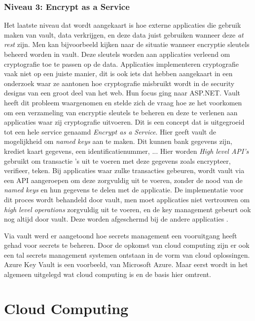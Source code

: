 \subsubsection{Niveau 3: Encrypt as a Service}

Het laatste niveau dat wordt aangekaart is hoe externe applicaties die gebruik maken van vault, data verkrijgen, en deze data juist gebruiken wanneer deze \textit{at rest} zijn. Men kan bijvoorbeeld kijken naar de situatie wanneer encryptie sleutels beheerd worden in vault. Deze sleutels worden aan applicaties verleend om cryptografie toe te passen op de data. Applicaties implementeren cryptografie vaak niet op een juiste manier, dit is ook iets dat \textcite{duong2011cryptography}
hebben aangekaart in een onderzoek waar ze aantonen hoe cryptografie misbruikt wordt in de security designs van een groot deel van het web. Hun focus ging naar ASP.NET. Vault heeft dit probleem waargenomen en stelde zich de vraag hoe ze het voorkomen om een verzameling van encryptie sleutels te beheren en deze te verlenen aan applicaties waar zij cryptografie uitvoeren. Dit is een concept dat is uitgegroeid tot een hele service genaamd \textit{Encrypt as a Service}. Hier geeft vault de mogelijkheid om \textit{named keys} aan te maken. Dit kunnen bank gegevens zijn, krediet kaart gegevens, een identificatienummer, ... Hier worden \textit{High level API's} gebruikt om transactie 's uit te voeren met deze gegevens zoals encrypteer, verifieer, teken. Bij applicaties waar zulke transacties gebeuren, wordt vault via een API aangeroepen om deze zorgvuldig uit te voeren, zonder de nood van de \textit{named keys} en hun gegevens te delen met de applicatie. De implementatie voor dit proces wordt behandeld door vault, men moet applicaties niet vertrouwen om \textit{high level operations} zorgvuldig uit te voeren, en de key management gebeurt ook nog altijd door vault. Deze worden afgeschermd bij de andere applicaties \autocite{Dadgar2018}. 

Via vault werd er aangetoond hoe secrets management een vooruitgang heeft gehad voor secrets te beheren. Door de opkomst van cloud computing zijn er ook een tal secrets management systemen ontstaan in de vorm van cloud oplossingen. Azure Key Vault is een voorbeeld, van Microsoft Azure. Maar eerst wordt in het algemeen uitgelegd wat cloud computing is en de basis hier omtrent.
\newpage


\section{Cloud Computing}
\label{sec:cloud oplossingen}

